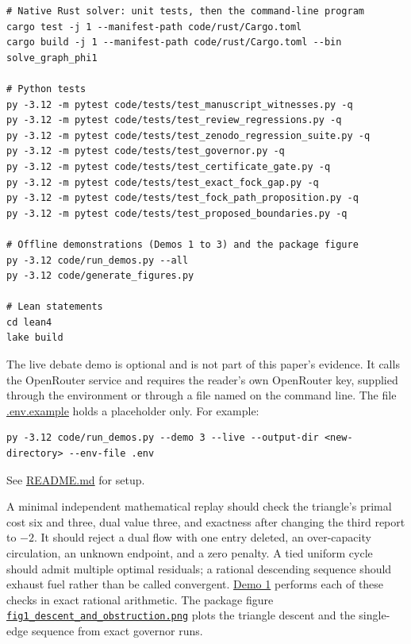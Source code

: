 \documentclass[
  11pt,
]{article}
\begin{document}
\begin{lstlisting}
# Native Rust solver: unit tests, then the command-line program
cargo test -j 1 --manifest-path code/rust/Cargo.toml
cargo build -j 1 --manifest-path code/rust/Cargo.toml --bin solve_graph_phi1

# Python tests
py -3.12 -m pytest code/tests/test_manuscript_witnesses.py -q
py -3.12 -m pytest code/tests/test_review_regressions.py -q
py -3.12 -m pytest code/tests/test_zenodo_regression_suite.py -q
py -3.12 -m pytest code/tests/test_governor.py -q
py -3.12 -m pytest code/tests/test_certificate_gate.py -q
py -3.12 -m pytest code/tests/test_exact_fock_gap.py -q
py -3.12 -m pytest code/tests/test_fock_path_proposition.py -q
py -3.12 -m pytest code/tests/test_proposed_boundaries.py -q

# Offline demonstrations (Demos 1 to 3) and the package figure
py -3.12 code/run_demos.py --all
py -3.12 code/generate_figures.py

# Lean statements
cd lean4
lake build
\end{lstlisting}

The live debate demo is optional and is not part of this paper's
evidence. It calls the OpenRouter service and requires the reader's own
OpenRouter key, supplied through the environment or through a file named
on the command line. The file
\href{https://github.com/dbccpage/the_symbol_game/blob/main/education/documentation/030_pfp_proposal_fidelity_protocol_pfp/papers/symbol_game/001_pfp_discrete_cochain_retraction_and_toy_involutions/.env.example}{.env.example}
holds a placeholder only. For example:

\begin{lstlisting}
py -3.12 code/run_demos.py --demo 3 --live --output-dir <new-directory> --env-file .env
\end{lstlisting}

See
\href{https://github.com/dbccpage/the_symbol_game/blob/main/education/documentation/030_pfp_proposal_fidelity_protocol_pfp/papers/symbol_game/001_pfp_discrete_cochain_retraction_and_toy_involutions/README.md}{README.md}
for setup.

A minimal independent mathematical replay should check the triangle's
primal cost six and three, dual value three, and exactness after
changing the third report to \(-2\). It should reject a dual flow with
one entry deleted, an over-capacity circulation, an unknown endpoint,
and a zero penalty. A tied uniform cycle should admit multiple optimal
residuals; a rational descending sequence should exhaust fuel rather
than be called convergent.
\href{https://github.com/dbccpage/the_symbol_game/blob/main/education/documentation/030_pfp_proposal_fidelity_protocol_pfp/papers/symbol_game/001_pfp_discrete_cochain_retraction_and_toy_involutions/code/demo1_holonomy.py}{Demo
1} performs each of these checks in exact rational arithmetic. The
package figure
\href{https://github.com/dbccpage/the_symbol_game/blob/main/education/documentation/030_pfp_proposal_fidelity_protocol_pfp/papers/symbol_game/001_pfp_discrete_cochain_retraction_and_toy_involutions/public_export/fig1_descent_and_obstruction.png}{\nolinkurl{fig1_descent_and_obstruction.png}}
plots the triangle descent and the single-edge sequence from exact
governor runs.
\end{document}

